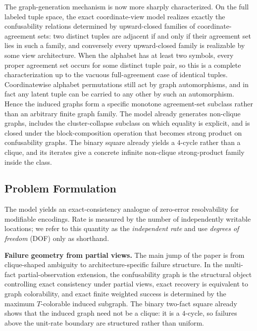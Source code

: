 The graph-generation mechanism is now more sharply characterized. On the full labeled tuple space, the exact coordinate-view model realizes exactly the confusability relations determined by upward-closed families of coordinate-agreement sets: two distinct tuples are adjacent if and only if their agreement set lies in such a family, and conversely every upward-closed family is realizable by some view architecture. When the alphabet has at least two symbols, every proper agreement set occurs for some distinct tuple pair, so this is a complete characterization up to the vacuous full-agreement case of identical tuples. Coordinatewise alphabet permutations still act by graph automorphisms, and in fact any latent tuple can be carried to any other by such an automorphism. Hence the induced graphs form a specific monotone agreement-set subclass rather than an arbitrary finite graph family. The model already generates non-clique graphs, includes the cluster-collapse subclass on which equality is explicit, and is closed under the block-composition operation that becomes strong product on confusability graphs. The binary square already yields a $4$-cycle rather than a clique, and its iterates give a concrete infinite non-clique strong-product family inside the class.

\subsection{Problem Formulation}\label{sec:encoding-problem}

The model yields an exact-consistency analogue of zero-error resolvability for modifiable encodings. Rate is measured by the number of independently writable locations; we refer to this quantity as the \emph{independent rate} and use \emph{degrees of freedom} (DOF) only as shorthand.

\noindent\textbf{Failure geometry from partial views.} The main jump of the paper is from clique-shaped ambiguity to architecture-specific failure structure. In the multi-fact partial-observation extension, the confusability graph is the structural object controlling exact consistency under partial views, exact recovery is equivalent to graph colorability, and exact finite weighted success is determined by the maximum $T$-colorable induced subgraph. The binary two-fact square already shows that the induced graph need not be a clique: it is a $4$-cycle, so failures above the unit-rate boundary are structured rather than uniform. 


